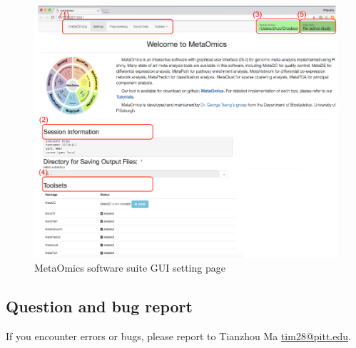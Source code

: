 \begin{figure}[H]
\begin{center}
\includegraphics[scale=1]{./figure/preprocessing/GUIsetting}
\caption{MetaOmics software suite GUI setting page}
\label{fig:GUIsetting}
\end{center}
\end{figure}


\subsection{Question and bug report}

If you encounter errors or bugs, please report to Tianzhou Ma \url{tim28@pitt.edu}.


 
